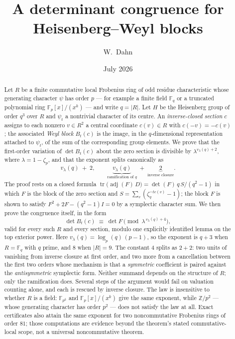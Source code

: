 \documentclass[11pt]{article}
\title{A determinant congruence for Heisenberg--Weyl blocks}
\author{W.~Dahn}
\date{July 2026}
\theoremstyle{plain}
\theoremstyle{definition}
\newcommand{\FF}{\mathbb F}
\newcommand{\ZZ}{\mathbb Z}
\newcommand{\adj}{\operatorname{adj}}
\newcommand{\tr}{\operatorname{tr}}
\newcommand{\vlam}{v_\lambda}
\begin{document}
\maketitle

\begin{abstract}
\noindent Let $R$ be a finite commutative local Frobenius ring of odd residue
characteristic whose generating character $\psi$ has order $p$ --- for example
a finite field $\FF_q$ or a truncated polynomial ring
$\FF_p[x]/(x^k)$ --- and write $q=|R|$. Let $H$ be
the Heisenberg group of order $q^3$ over $R$ and $\psi_t$ a nontrivial
character of its centre. An \emph{inverse-closed section} $c$ assigns to each
nonzero $v\in R^2$ a central coordinate $c(v)\in R$ with $c(-v)=-c(v)$; the
associated \emph{Weyl block} $B_t(c)$ is the image, in the $q$-dimensional
representation attached to $\psi_t$, of the sum of the corresponding group
elements. We prove that the first-order variation of $\det B_t(c)$ about the
zero section is divisible by $\lambda^{\vlam(q)+2}$, where $\lambda=1-\zeta_p$,
and that the exponent splits canonically as
\[
\vlam(q) \;+\; 2,\qquad
\underbrace{\vlam(q)}_{\text{ramification of }q}
\;+\;\underbrace{2}_{\text{inverse closure}} .
\]
The proof rests on a closed formula
$\tr\bigl(\adj(F)\,D\bigr)=\det(F)\,q\,S/(q^2-1)$ in which $F$ is the block of
the zero section and $S=\sum_{v}(\zeta_q^{-tc(v)}-1)$; the block $F$ is shown to
satisfy $F^2+2F-(q^2-1)I=0$ by a symplectic character sum. We then prove the
congruence itself, in the form
\[
\det B_t(c)\;\equiv\;\det F \pmod{\lambda^{\,\vlam(q)+4}},
\]
valid for every such $R$ and every section, modulo one explicitly identified
lemma on the top exterior power. Here $\vlam(q)=\log_p(q)\,(p-1)$, so the
exponent is $q+3$ when $R=\FF_q$ with $q$ prime, and $8$ when $|R|=9$. The
constant $4$ splits as $2+2$: two units of vanishing from inverse closure at
first order, and two more from a cancellation between the first two orders
whose mechanism is that a \emph{symmetric} coefficient is paired against the
\emph{antisymmetric} symplectic form. Neither summand depends on the structure
of $R$; only the ramification does. Several steps of the argument would fail on
valuation counting alone, and each is rescued by inverse closure. The law is
insensitive to whether $R$ is a field: $\FF_{p^k}$ and $\FF_p[x]/(x^k)$ give
the same exponent, while $\ZZ/p^2$ --- whose generating character has order
$p^2$ --- does not satisfy the law at all.  Exact certificates also attain the
same exponent for two noncommutative Frobenius rings of order $81$; those
computations are evidence beyond the theorem's stated commutative-local scope,
not a universal noncommutative theorem.


\end{abstract}
\end{document}

